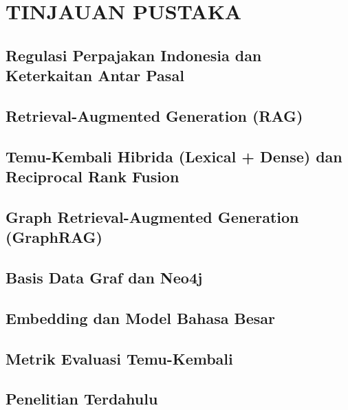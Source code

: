 \chapter{TINJAUAN PUSTAKA}
\label{bab:tinjauan-pustaka}

\section{Regulasi Perpajakan Indonesia dan Keterkaitan Antar Pasal}

\section{Retrieval-Augmented Generation (RAG)}

\section{Temu-Kembali Hibrida (Lexical + Dense) dan Reciprocal Rank Fusion}

\section{Graph Retrieval-Augmented Generation (GraphRAG)}

\section{Basis Data Graf dan Neo4j}

\section{Embedding dan Model Bahasa Besar}

\section{Metrik Evaluasi Temu-Kembali}

\section{Penelitian Terdahulu}
